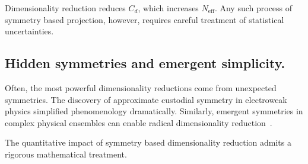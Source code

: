         Dimensionality reduction reduces \(C_d\), which increases \(N_{\text{eff}}\).
        Any such process of symmetry based projection, however, requires careful treatment of statistical uncertainties.
        
        \subsection{Hidden symmetries and emergent simplicity.}
            Often, the most powerful dimensionality reductions come from unexpected symmetries.
            The discovery of approximate custodial symmetry in electroweak physics simplified phenomenology dramatically.
            Similarly, emergent symmetries in complex physical ensembles can enable radical dimensionality reduction~\cite{schmalian_emergent_2008}.

            The quantitative impact of symmetry based dimensionality reduction admits a rigorous mathematical treatment.

